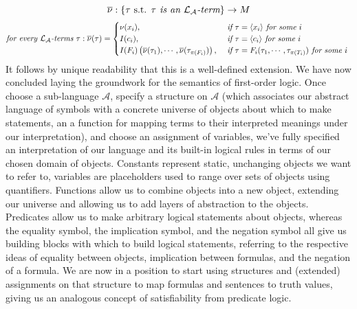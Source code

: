 \documentclass{article}
\begin{document}
    $$ \overline{\nu}: \{ \tau \textnormal{ s.t. } \textit{$ \tau $ is an $ \mathcal{L}_{\mathcal{A}} $-term} \} \rightarrow M $$
    $$ \textit{for every $ \mathcal{L}_{\mathcal{A}} $-terms } \tau: \overline{\nu}(\tau) = \begin{cases}
        \nu(x_i), &\textit{ if } \tau = \langle x_i \rangle \textit{ for some $ i $ } \\
        I(c_i), &\textit{ if } \tau = \langle c_i \rangle \textit{ for some $ i $ } \\
        I(F_i) \left(\overline{\nu}(\tau_1), \cdots, \overline{\nu}(\tau_{\pi(F_i)}) \right), &\textit{ if } \tau = F_i(\tau_1, \cdots, \tau_{\pi(T_i)}) \textit{ for some $ i $ }
    \end{cases} $$
\n
It follows by unique readability that this is a well-defined extension. We have now concluded laying the groundwork for the semantics of first-order logic. Once choose a sub-language $ \mathcal{A} $, specify a structure on $ \mathcal{A} $ (which associates our abstract language of symbols with a concrete universe of objects about which to make statements, an a function for mapping terms to their interpreted meanings under our interpretation), and choose an assignment of variables, we've fully specified an interpretation of our language and its built-in logical rules in terms of our chosen domain of objects. Constants represent static, unchanging objects we want to refer to, variables are placeholders used to range over sets of objects using quantifiers. Functions allow us to combine objects into a new object, extending our universe and allowing us to add layers of abstraction to the objects. Predicates allow us to make arbitrary logical statements about objects, whereas the equality symbol, the implication symbol, and the negation symbol all give us building blocks with which to build logical statements, referring to the respective ideas of equality between objects, implication between formulas, and the negation of a formula. We are now in a position to start using structures and (extended) assignments on that structure to map formulas and sentences to truth values, giving us an analogous concept of satisfiability from predicate logic.
\end{document}
